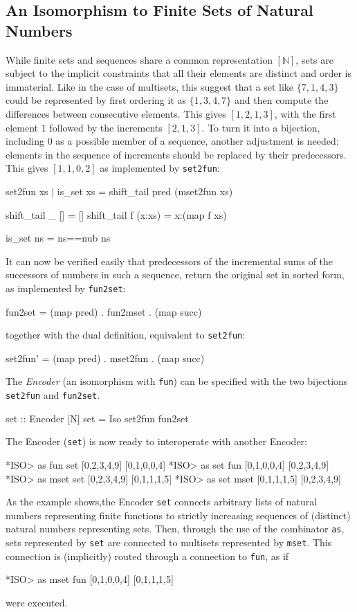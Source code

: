 \documentclass[]{INCLUDES/llncs}
\begin{document}
\subsection{An Isomorphism to Finite Sets of Natural Numbers}
While finite sets and sequences share a common representation $[\mathbb{N}]$,
sets are subject to the implicit constraints that all their elements
are distinct and order is immaterial.
Like in the case of multisets, this suggest that a set like $\{7,1,4,3\}$ could
be represented by first ordering it as $\{1,3,4,7\}$ and then compute the 
differences between consecutive elements. This gives $[1,2,1,3]$, with
the first element $1$ followed by the increments $[2,1,3]$. To turn
it into a bijection, including $0$ as a possible member of a sequence,
another adjustment is needed: elements in the sequence of increments should
be replaced by their predecessors. This gives $[1,1,0,2]$ as implemented
by {\tt set2fun}:
\begin{code}
set2fun xs | is_set xs = shift_tail pred (mset2fun xs)

shift_tail _ [] = []
shift_tail f (x:xs) = x:(map f xs)

is_set ns = ns==nub ns
\end{code}
It can now be verified easily that predecessors of the incremental sums of the
successors of numbers in such a sequence, return the original set
in sorted form, as implemented by {\tt fun2set}:
\begin{code}
fun2set = (map pred) . fun2mset . (map succ)
\end{code}
together with the dual definition, equivalent to {\tt set2fun}:
\begin{code}
set2fun' = (map pred) . mset2fun . (map succ)
\end{code}
The {\em Encoder} (an isomorphism with {\tt fun}) can be specified with the two
bijections {\tt set2fun} and {\tt fun2set}.
\begin{code}
set :: Encoder [N]
set = Iso set2fun fun2set
\end{code}
The Encoder ({\tt set}) is now ready to interoperate 
with another Encoder:
\begin{codex}
*ISO> as fun set [0,2,3,4,9]
[0,1,0,0,4]
*ISO> as set fun [0,1,0,0,4]
[0,2,3,4,9]
*ISO> as mset set [0,2,3,4,9]
[0,1,1,1,5]
*ISO> as set mset [0,1,1,1,5]
[0,2,3,4,9]
\end{codex}
As the example shows,the Encoder {\tt set} connects arbitrary lists of
natural numbers representing finite functions
to strictly increasing sequences
of (distinct) natural numbers representing sets.
Then, through the use of the combinator {\tt as}, sets represented by {\tt set}
are connected to multisets represented by {\tt mset}. This connection is
(implicitly) routed through a connection to {\tt fun}, as if
\begin{codex}
*ISO> as mset fun [0,1,0,0,4]
[0,1,1,1,5]
\end{codex}
were executed.
\end{document}
